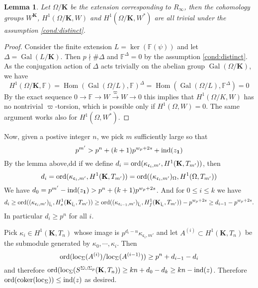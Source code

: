 \documentclass[leqno]{amsart}
\newcommand{\fF}{\mathbb{F}} %
\newcommand{\flw}{\bar{\fl}}
\DeclareMathOperator{\Gal}{Gal}
\newcommand{\ord}{\textnormal{ord}}
\newcommand{\id}{\mathbf{1}}
\newcommand{\K}{{\mathbf{K}}} %
\newcommand{\fc}{\mathfrak{c}}
\newcommand{\fl}{\mathfrak{l}}
\DeclareMathOperator{\Hom}{Hom}
\DeclareMathOperator{\coker}{coker}
\newtheorem{lem}[thm]{Lemma}
\theoremstyle{definition}
\theoremstyle{remark}
\begin{document}
\begin{lem}
	Let $\Omega/\K$ be the extension corresponding
	to $R_{\infty}$, then the cohomology groups
	$W^\K$, $H^1(\Omega/\K, W)$ and $H^1(\Omega/\K, W^*)$ 
	are all trivial under the assumption \eqref{cond:distinct}.
\end{lem}
\begin{proof}
	Consider the finite extension $L=\ker(\fF(\psi))$
	and let $\Delta=\Gal(L/\K)$.
	Then  $p\nmid \#\Delta$ 
	and $\fF^\Delta=0$ by the assumption  \ref{cond:distinct}.
	As the conjugation action of $\Delta$ acts trivially
	on the abelian group $\Gal(\Omega/\K)$, we have
	\[
		H^1(\Omega/\K,\fF)=
		\Hom(\Gal(\Omega/L),\fF)^\Delta=
		\Hom(\Gal(\Omega/L),\fF^\Delta)=0
	\]
	By the exact sequence
	$0\to\fF\to W\xrightarrow{\varpi}W\to 0$
	this implies that $H^1(\Omega/K,W)$
	has no nontrivial $\varpi$-torsion, 
	which is possible only if  $H^1(\Omega,W)=0$.
	The same argument works also for $H^1(\Omega,W^*)$.
\end{proof}

Now, given a postive integer $n$,
we pick  $m$ sufficiently large so that
\[
p^{m'}> p^n+(k+1)p^{w_p+2s}+\textnormal{ind}(z_{\id})
\]
By the lemma above,dd
if we define $d_i=\ord(\kappa_{\fc_{i},m'}, H^1(\K,T_{m'}))$, then
\[
	d_i=\ord(\kappa_{\fc_{i},m'}, H^1(\K,T_{m'}))=
	\ord( (\kappa_{\fc_{i},m'})_\Omega, H^1(\Omega,T_{m'}))
\]
We have $d_0=p^{m'}-\textnormal{ind}(z_{\id})>p^n+(k+1)p^{w_p+2s}$.
And for $0\leq i\leq k$ we have
\[
	d_i\geq 
	\ord( (\kappa_{\fc_i,m'})_{\flw_i}, H^1_s(\K_{\flw_i}, T_{m'}))\geq
	\ord( (\kappa_{\fc_{i-1},m'})_{\flw_i}, H^1_f(\K_{\flw_i}, T_{m'}))-p^{w_p+2s}\geq 
	d_{i-1}-p^{w_p+2s}.
\]
In particular $d_i\geq p^n$ for all  $i$.

Pick  $\kappa_i\in H^1(\K, T_{n})$ whose image 
is $p^{d_i-n}\kappa_{\fc_i,m'}$
and let $A^{(i)}\subset H^1(\K,T_{n})$
be the submodule generated by $\kappa_0,\cdots,\kappa_i$.
Then 
\[
	\ord(\textnormal{loc}_\Sigma(A^{(i)})/\textnormal{loc}_\Sigma(A^{(i-1)}))
	\geq p^n+d_{i-1}-d_{i}
\]
and therefore
$\ord(\textnormal{loc}_\Sigma(S^{\Sigma\cup \Sigma_p}(\K, T_{n})) 
\geq kn+d_0-d_{k}\geq kn-\textnormal{ind}(z)$.
Therefore $\ord(\coker(\textnormal{loc}_\Sigma))\leq \textnormal{ind}(z)$
as desired.




\end{document}
